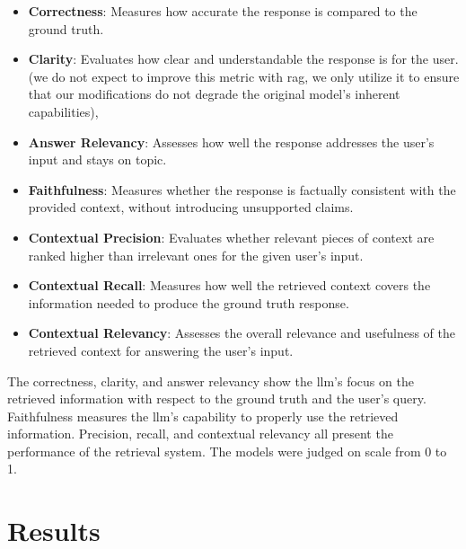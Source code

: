 \documentclass[fleqn,moreauthors,10pt]{ds_report}
\begin{document}
\begin{itemize}
\setlength\itemsep{-0.3em}
	\item \textbf{Correctness}: Measures how accurate the response is compared to the ground truth.

	\item \textbf{Clarity}: Evaluates how clear and understandable the response is for the user. (we do not expect to improve this metric with \ac{rag}, we only utilize it to ensure that our modifications do not degrade the original model's inherent capabilities),
	
	\item \textbf{Answer Relevancy}: Assesses how well the response addresses the user's input and stays on topic.
	
	\item \textbf{Faithfulness}: Measures whether the response is factually consistent with the provided context, without introducing unsupported claims.
	
	\item \textbf{Contextual Precision}: Evaluates whether relevant pieces of context are ranked higher than irrelevant ones for the given user's input.
	
	\item \textbf{Contextual Recall}: Measures how well the retrieved context covers the information needed to produce the ground truth response.
	
	\item \textbf{Contextual Relevancy}: Assesses the overall relevance and usefulness of the retrieved context for answering the user's input.

\end{itemize} 

The correctness, clarity, and answer relevancy show the \ac{llm}'s focus on the retrieved information with respect to the ground truth and the user's query. Faithfulness measures the \ac{llm}'s capability to properly use the retrieved information. Precision, recall, and contextual relevancy all present the performance of the retrieval system. The models were judged on scale from 0 to 1. 

\section*{Results}
\end{document}
